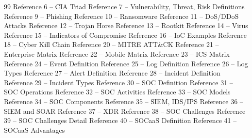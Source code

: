 \begin{thebibliography}{99}
 Reference 6 -- CIA Triad
 Reference 7 -- Vulnerability, Threat, Risk Definitions
 Reference 9 -- Phishing
 Reference 10 -- Ransomware
 Reference 11 -- DoS/DDoS Attacks
 Reference 12 -- Trojan Horse
 Reference 13 -- Rootkit 
 Reference 14 -- Virus
 Reference 15 -- Indicators of Compromise
 Reference 16 -- IoC Examples
 Reference 18 -- Cyber Kill Chain
 Reference 20 -- MITRE ATT\&CK
 Reference 21 -- Enterprise Matrix
 Reference 22 -- Mobile Matrix
 Reference 23 -- ICS Matrix
 Reference 24 -- Event Definition
 Reference 25 -- Log Definition
 Reference 26 -- Log Types
 Reference 27 -- Alert Definition
 Reference 28 -- Incident Definition
 Reference 29 -- Incident Types
 Reference 30 -- SOC Definition
 Reference 31 -- SOC Operations
 Reference 32 -- SOC Activities
 Reference 33 -- SOC Models
 Reference 34 -- SOC Components
 Reference 35 -- SIEM, IDS/IPS
 Reference 36 -- SIEM and SOAR
 Reference 37 -- XDR
 Reference 38 -- SOC Challenges
 Reference 39 -- SOC Challenges Detail
 Reference 40 -- SOCaaS Definition
 Reference 41 -- SOCaaS Advantages
\end{thebibliography}